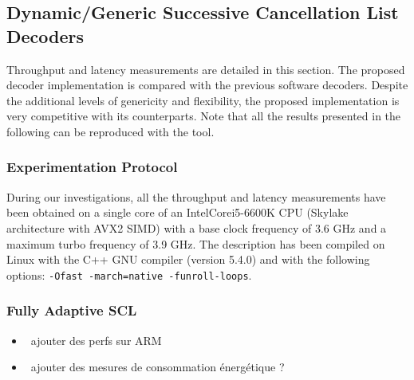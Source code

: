 \subsection{Dynamic/Generic Successive Cancellation List Decoders}

Throughput and latency measurements are detailed in this section. The proposed
decoder implementation is compared with the previous software decoders. Despite
the additional levels of genericity and flexibility, the proposed implementation
is very competitive with its counterparts. Note that all the results presented
in the following can be reproduced with the \AFFECT tool.

\subsubsection{Experimentation Protocol}

During our investigations, all the throughput and latency measurements have been
obtained on a single core of an Intel\R Core\TM i5-6600K CPU (Skylake
architecture with AVX2 SIMD) with a base clock frequency of 3.6 GHz and a
maximum turbo frequency of 3.9 GHz. The description has been compiled on Linux
with the C++ GNU compiler (version 5.4.0) and with the following options:
\verb|-Ofast -march=native -funroll-loops|.

\subsubsection{Fully Adaptive SCL}

\begin{itemize}
  \item \xmark~ajouter des perfs sur ARM
  \item \xmark~ajouter des mesures de consommation énergétique ?
\end{itemize}

